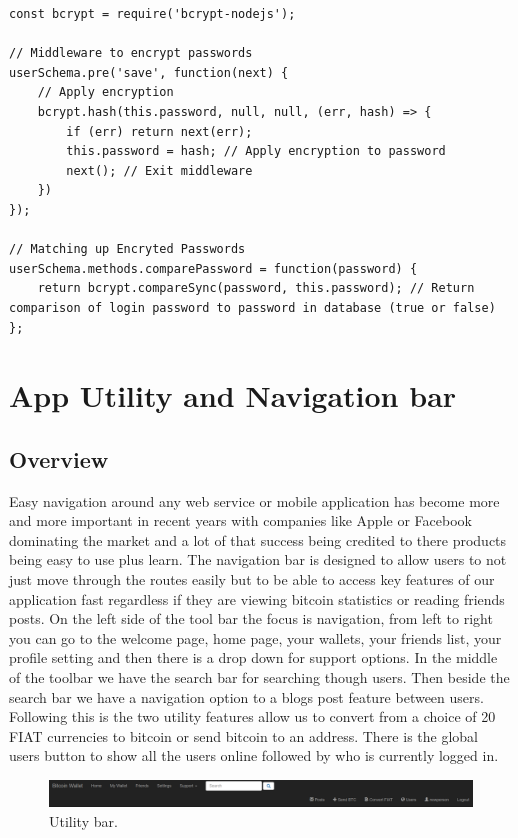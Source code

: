 \begin{lstlisting}
const bcrypt = require('bcrypt-nodejs');

// Middleware to encrypt passwords
userSchema.pre('save', function(next) {
    // Apply encryption
    bcrypt.hash(this.password, null, null, (err, hash) => {
        if (err) return next(err);
        this.password = hash; // Apply encryption to password
        next(); // Exit middleware
    })
});

// Matching up Encryted Passwords
userSchema.methods.comparePassword = function(password) {
    return bcrypt.compareSync(password, this.password); // Return comparison of login password to password in database (true or false)
};
\end{lstlisting}

\section{App Utility and Navigation bar}

\subsection{Overview}
Easy navigation around any web service or mobile application has become more and more important in recent years with companies like Apple or Facebook dominating the market and a lot of that success being credited to there products being easy to use plus learn. The navigation bar is designed to allow users to not just move through the routes easily but to be able to access key features of our application fast regardless if they are viewing bitcoin statistics or reading friends posts. On the left side of the tool bar the focus is navigation, from left to right you can go to the welcome page, home page, your wallets, your friends list, your profile setting and then there is a drop down for support options. In the middle of the toolbar we have the search bar for searching though users. Then beside the search bar we have a navigation option to a blogs post feature between users. Following this is the two utility features allow us to convert from a choice of 20 FIAT currencies to bitcoin or send bitcoin to an address. There is the global users button to show all the users online followed by who is currently logged in.

\begin{figure}[H]
\centering
\includegraphics[]{img/ToolBar.png}
\caption{Utility bar.}
\end{figure}


